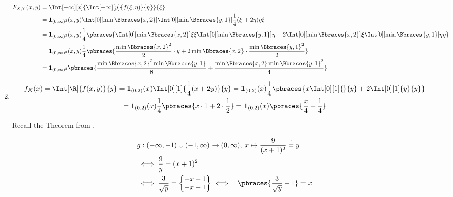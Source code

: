 \begin{solution}
\begin{enumerate}[label = (\alph*)]
    \begin{align*}
        F_{X, Y}(x, y)
        & =
        \Int[-\infty][x]
        {
            \Int[-\infty][y]
            {
                f(\xi, \eta)
            }{\eta}
        }{\xi} \\
        & =
        \mathbf 1_{(0, \infty)^2}(x, y)
        \Int[0][\min \Bbraces{x, 2}]
        {
            \Int[0][\min \Bbraces{y, 1}]
            {
                \frac{1}{4}
                (\xi + 2 \eta)
            }{\eta}
        }{\xi} \\
        & =
        \mathbf 1_{(0, \infty)^2}(x, y)
        \frac{1}{4}
        \pbraces
        {
            \Int[0][\min \Bbraces{x, 2}]{\xi}{\xi}
            \Int[0][\min \Bbraces{y, 1}]{}{\eta}
            +
            2
            \Int[0][\min \Bbraces{x, 2}]{}{\xi}
            \Int[0][\min \Bbraces{y, 1}]{\eta}{\eta}
        } \\
        & =
        \mathbf 1_{(0, \infty)^2}(x, y)
        \frac{1}{4}
        \pbraces
        {
            \frac{\min \Bbraces{x, 2}^2}{2} \cdot y
            +
            2 \min \Bbraces{x, 2} \cdot \frac{\min \Bbraces{y, 1}^2}{2}
        } \\
        & =
        \mathbf 1_{(0, \infty)^2}
        \pbraces
        {
            \frac{\min \Bbraces{x, 2}^2 \min \Bbraces{y, 1}}{8}
            +
            \frac{\min \Bbraces{x, 2} \min \Bbraces{y, 1}^2}{4}
        }
    \end{align*}

    \item

    \begin{multline*}
        f_X(x)
        =
        \Int[\R]{f(x, y)}{y}
        =
        \mathbf 1_{(0, 2)}(x) \Int[0][1]{\frac{1}{4} (x + 2 y)}{y}
        =
        \mathbf 1_{(0, 2)}(x)
        \frac{1}{4}
        \pbraces
        {
            x \Int[0][1]{}{y}
            +
            2 \Int[0][1]{y}{y}
        } \\
        =
        \mathbf 1_{(0, 2)}(x) \frac{1}{4} \pbraces{x \cdot 1 + 2 \cdot \frac{1}{2}}
        =
        \mathbf 1_{(0, 2)}(x)
        \pbraces
        {
            \frac{x}{4}
            +
            \frac{1}{4}
        }
    \end{multline*}

    Recall the Theorem from \cite[Lecture 3, Slide 38]{EStat}.

    \begin{align*}
        &
        g:
            (-\infty, -1) \cup (-1, \infty) \to (0, \infty), \,
            x \mapsto \frac{9}{(x + 1)^2} \stackrel{!}{=} y \\
        & \iff
        \frac{9}{y} = (x + 1)^2 \\
        & \iff
        \frac{3}{\sqrt y}
        =
        \begin{Bmatrix}
            +x + 1 \\
            -x + 1
        \end{Bmatrix}
        \iff
        \pm \pbraces{\frac{3}{\sqrt y} - 1} = x
    \end{align*}


\end{enumerate}
\end{solution}
